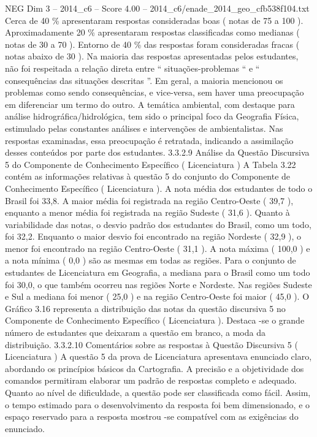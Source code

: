 \begin{textsample}{NEG Dim 3 – 2014\_c6 – Score 4.00 – 2014\_c6/enade\_2014\_geo\_cfb538f104.txt}
Cerca de 40 \% apresentaram respostas consideradas boas ( notas de 75 a 100 ).
Aproximadamente 20 \% apresentaram respostas classificadas como medianas ( notas de 30 a 70 ).
Entorno de 40 \% das respostas foram consideradas fracas ( notas abaixo de 30 ).
Na maioria das respostas apresentadas pelos estudantes, não foi respeitada a relação direta entre “ situações-problemas “ e “ consequências das situações descritas ”.
Em geral, a maioria mencionou os problemas como sendo consequências, e vice-versa, sem haver uma preocupação em diferenciar um termo do outro.
A temática ambiental, com destaque para análise hidrográfica/hidrológica, tem sido o principal foco da Geografia Física, estimulado pelas constantes análises e intervenções de ambientalistas.
Nas respostas examinadas, essa preocupação é retratada, indicando a assimilação desses conteúdos por parte dos estudantes. 3.3.2.9 Análise da Questão Discursiva 5 do Componente de Conhecimento Específico ( Licenciatura ) A Tabela 3.22 contém as informações relativas à questão 5 do conjunto do Componente de Conhecimento Específico ( Licenciatura ).
A nota média dos estudantes de todo o Brasil foi 33,8.
A maior média foi registrada na região Centro-Oeste ( 39,7 ), enquanto a menor média foi registrada na região Sudeste ( 31,6 ).
Quanto à variabilidade das notas, o desvio padrão dos estudantes do Brasil, como um todo, foi 32,2.
Enquanto o maior desvio foi encontrado na região Nordeste ( 32,9 ), o menor foi encontrado na região Centro-Oeste ( 31,1 ).
A nota máxima ( 100,0 ) e a nota mínima ( 0,0 ) são as mesmas em todas as regiões.
Para o conjunto de estudantes de Licenciatura em Geografia, a mediana para o Brasil como um todo foi 30,0, o que também ocorreu nas regiões Norte e Nordeste.
Nas regiões Sudeste e Sul a mediana foi menor ( 25,0 ) e na região Centro-Oeste foi maior ( 45,0 ).
O Gráfico 3.16 representa a distribuição das notas da questão discursiva 5 no Componente de Conhecimento Específico ( Licenciatura ).
Destaca -se o grande número de estudantes que deixaram a questão em branco, a moda da distribuição. 3.3.2.10 Comentários sobre as respostas à Questão Discursiva 5 ( Licenciatura ) A questão 5 da prova de Licenciatura apresentava enunciado claro, abordando os princípios básicos da Cartografia.
A precisão e a objetividade dos comandos permitiram elaborar um padrão de respostas completo e adequado.
Quanto ao nível de dificuldade, a questão pode ser classificada como fácil.
Assim, o tempo estimado para o desenvolvimento da resposta foi bem dimensionado, e o espaço reservado para a resposta mostrou -se compatível com as exigências do enunciado.

\end{textsample}
